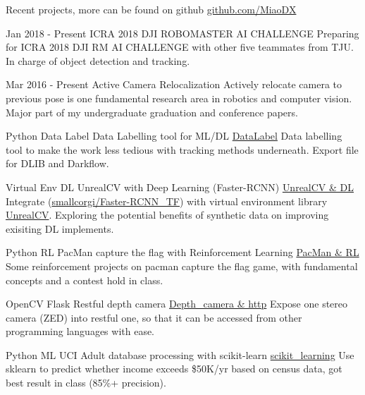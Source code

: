 \documentclass[utf8]{twentysecondcv} %
\begin{document}
\begin{twenty}

    \twentyitem
        {}
        {}        
        {Recent projects, more can be found on github}
        {\href{https://github.com/MiaoDX/}{github.com/MiaoDX}}
        {}
        {}
          
    \twentyitem
    {Jan 2018 - }
    {Present}
    {ICRA 2018 DJI ROBOMASTER AI CHALLENGE}
    {}
    {}
    {Preparing for ICRA 2018 DJI RM AI CHALLENGE with other five teammates from TJU. In charge of object detection and tracking.}        
    
    \twentyitem
    {Mar 2016 -}
    {Present}
    {Active Camera Relocalization}
    {}
    {}
    {Actively relocate camera to previous pose is one fundamental research area in robotics and computer vision. Major part of my undergraduate graduation and conference papers.}
    
	\twentyitem
        {Python}
		{Data Label}
        {Data Labelling tool for ML/DL}
        {\href{https://github.com/MiaoDX/DataLabel}{DataLabel}}
        {}
        {Data labelling tool to make the work less tedious with tracking methods underneath. Export file for DLIB and Darkflow.}
          
    \twentyitem
        {Virtual Env}
      	{DL}
        {UnrealCV with Deep Learning (Faster-RCNN)}
        {\href{https://github.com/MiaoDX/unrealcv_examples/}{UnrealCV \& DL}}
        {}
        {Integrate (\href{https://github.com/smallcorgi/Faster-RCNN\_TF}{smallcorgi/Faster-RCNN\_TF}) with virtual environment library \href{https://github.com/unrealcv/unrealcv}{UnrealCV}. Exploring the potential benefits of synthetic data on improving exisiting DL implements.}
                 
    \twentyitem
        {Python}
		{RL}
        {PacMan capture the flag with Reinforcement Learning}
        {\href{https://github.com/MiaoDX/hand_in_homework/tree/master/Advanced\_AI/}{PacMan \& RL}}
        {}
        {Some reinforcement projects on pacman capture the flag game, with fundamental concepts and a contest hold in class.}
        
		\twentyitem
        {OpenCV}
        {Flask}
        {Restful depth camera}
        {\href{https://github.com/MiaoDX/depth\_camera}{Depth\_camera \& http}}
        {}
        {Expose one stereo camera (ZED) into restful one, so that it can be accessed from other programming languages with ease.}

	    \twentyitem
        {Python}
		{ML}
        {UCI Adult database processing with scikit-learn}
        {\href{https://github.com/MiaoDX/scikit\_learning/}{scikit\_learning}}
        {}
        {Use sklearn to predict whether income exceeds \$50K/yr based on census data, got best result in class (85\%+ precision).}
        

\end{twenty}
\end{document}
